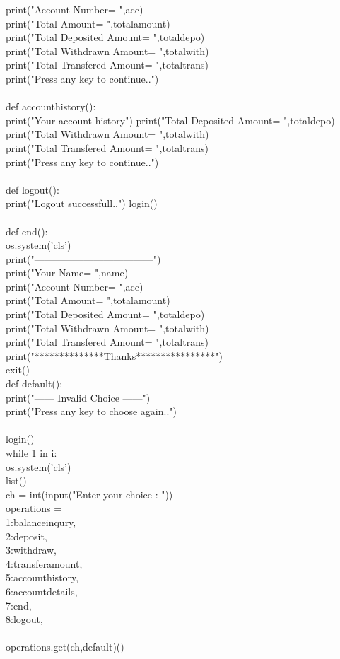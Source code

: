 \documentclass[12pt,a4 paper]{article}
\begin{document}
  print("Account Number= ",acc)\\
  print("Total Amount= ",totalamount)\\ 
  print("Total Deposited Amount= ",totaldepo)\\ 
  print("Total Withdrawn Amount= ",totalwith)\\ 
  print("Total Transfered Amount= ",totaltrans)\\ 
  print("Press any key to continue..")\\
\\
def accounthistory():\\
	print("Your account history")
  print("Total Deposited Amount= ",totaldepo)\\ 
  print("Total Withdrawn Amount= ",totalwith)\\
  print("Total Transfered Amount= ",totaltrans)\\ 
  print("Press any key to continue..")\\
\\
def logout():\\
	print("Logout successfull..")
	login()\\
\\
def end():\\
  os.system('cls')\\
  print("------------------------------------")\\
  print("Your Name= ",name)\\
  print("Account Number= ",acc)\\
  print("Total Amount= ",totalamount)\\ 
  print("Total Deposited Amount= ",totaldepo)\\
  print("Total Withdrawn Amount= ",totalwith)\\
  print("Total Transfered Amount= ",totaltrans)\\ 
  print("**************Thanks****************")\\
  exit()\\

def default():\\
  print("------ Invalid Choice ------")\\
  print("Press any key to choose again..")\\
\\
login()\\
while 1 in i:\\
 os.system('cls')\\
 list()\\
 ch = int(input("Enter your choice : "))\\
 operations = {\\
    1:balanceinqury,\\
    2:deposit,\\
    3:withdraw,\\
    4:transferamount,\\
    5:accounthistory,\\
    6:accountdetails,\\
    7:end,\\
    8:logout,\\
  }\\
 operations.get(ch,default)()\\
\end{document}
